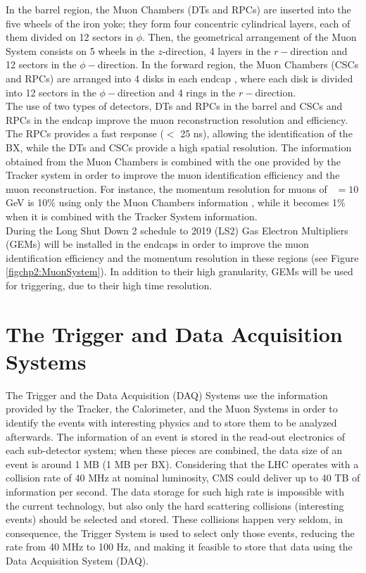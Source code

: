 \noindent In the barrel region, the Muon Chambers (DTs and RPCs) are inserted into the 
five wheels of the iron yoke; they form four concentric cylindrical 
layers, each of them divided on 12 sectors in $\phi$. Then, the geometrical 
arrangement of the Muon System consists on 5 wheels in the $z$-direction, 4 layers in 
the $r-$direction and 12 sectors in the $\phi-$direction. In the forward region, the Muon 
Chambers (CSCs and RPCs) are arranged into 4 disks in each endcap , where each disk is 
divided into 12 sectors in the $\phi-$direction and 4 rings in the $r-$direction. \\

\noindent The use of two types of detectors, DTs and RPCs in the barrel and CSCs and RPCs in the endcap
improve the muon reconstruction resolution and efficiency. The RPCs provides a fast 
response ($<$ 25 ns), allowing the identification of the BX, while the DTs and CSCs provide 
a high spatial resolution. The information obtained from the Muon Chambers
is combined with the one provided by the Tracker system in order to 
improve the muon identification efficiency and the muon reconstruction. For instance,
the momentum resolution for muons of \pt~$= 10$ GeV is 10$\%$ using only the Muon Chambers information
, while it becomes 1$\%$ when it is combined with the Tracker System information\cite{chp2:CMSTDR}.\\

\noindent During the Long Shut Down 2 schedule to 2019 (LS2) Gas Electron Multipliers (GEMs) will be installed in 
the endcaps in order to improve the muon identification efficiency and the momentum resolution in 
these regions (see Figure \ref{figchp2:MuonSystem}). In addition to their 
high granularity, GEMs will be used for triggering, due to their high time resolution.

\section{The Trigger and Data Acquisition Systems}
\label{sec:Trigger}

\noindent The Trigger and the Data Acquisition (DAQ) Systems use the information 
provided by the Tracker, the Calorimeter, and the Muon Systems in order 
to identify the events with interesting physics and to store them to be 
analyzed afterwards. The information of an event is stored in 
the read-out electronics of each sub-detector system; when these 
pieces are combined, the data size of an event is around 
1 MB (1 MB per BX). Considering that the LHC 
operates with a collision rate of 40 MHz at nominal luminosity, CMS could 
deliver up to 40 TB of information per second. The data storage 
for such high rate is impossible with the current technology, but also only the hard
scattering collisions (interesting events) should be selected and stored. These collisions
happen very seldom, in consequence, the Trigger System is used to 
select only those events, reducing the rate from 40 MHz to 100 Hz, and making 
it feasible to store that data using the Data Acquisition System (DAQ).


